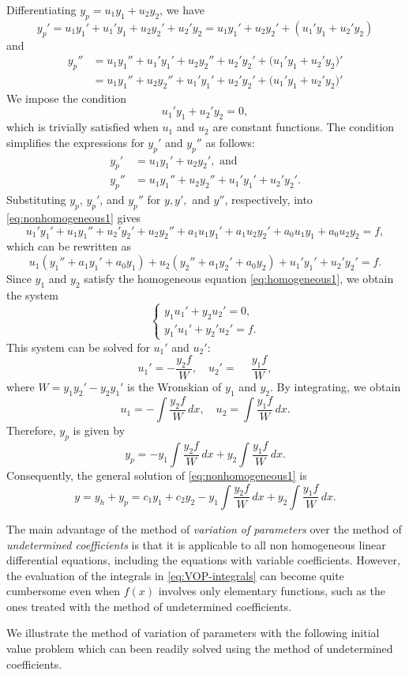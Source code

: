 Differentiating $y_p = u_1y_1 +u_2y_2$, we have
\[
y_p' = u_1 y_1' +u_1' y_1  + u_2 y_2'+  u_2' y_2
=  u_1 y_1' + u_2 y_2'+(u_1' y_1 + u_2' y_2)
\]
and 
\[
\begin{aligned}
y_p'' &=  u_1 y_1'' +u_1' y_1' +u_2 y_2''+  u_2' y_2' + \big( u_1' y_1 + u_2' y_2 \big)'\\[4pt]
&= u_1 y_1''+u_2 y_2'' +u_1' y_1' +  u_2' y_2' + \big( u_1' y_1 + u_2' y_2 \big)'
\end{aligned}
\]
We impose the condition
\[
u_1' y_1 + u_2' y_2 = 0, 
\]
which is trivially satisfied when $u_1$ and $u_2$ are constant functions.  
The condition simplifies the expressions for $y_p'$ and $y_p''$ as follows:
\[\begin{aligned}
y_p' &=  u_1 y_1' + u_2 y_2', \text{ and }\\
y_p'' &= u_1 y_1''+u_2 y_2'' +u_1' y_1' +  u_2' y_2'.
\end{aligned}
\]
Substituting $y_p$, $y_p'$, and $y_p''$ for $y, y',$ and $y''$, respectively, into \eqref{eq:nonhomogeneous1} gives
\[
	u_1' y_1' + u_1 y_1'' + u_2' y_2' + u_2 y_2''+a_1u_1 y_1' + a_1u_2 y_2'
+a_0u_1 y_1 + a_0u_2 y_2 = f,
\]
which can be rewritten as
\[
u_1 (y_1''+a_1 y_1'+a_0 y_1)+ u_2 (y_2''+a_1 y_2'+a_0 y_2) +u_1' y_1' +  u_2' y_2' 
= f.
\]
Since $y_1$ and $y_2$ satisfy the homogeneous equation \eqref{eq:homogeneous1}, we obtain the system
\[
\begin{cases}
	y_1 u_1' + y_2 u_2' = 0,\\
	y_1' u_1' + y_2' u_2' = f.
\end{cases}
\]
This system can be solved for $u_1'$ and $u_2'$:
\[
u_1' = -\frac{y_2 f}{W}, 
\quad 
u_2' = \phantom{-}\frac{y_1 f}{W},\]
where 
\(W = y_1 y_2' - y_2 y_1'\)
 is the Wronskian of  \(y_1\)  and  \(y_2.\)
By integrating, we obtain
\begin{equation}\label{eq:VOP-integrals}
u_1 = -\int \frac{y_2 f}{W} \, dx, 
\quad 
u_2 = \int \frac{y_1 f}{W} \, dx.
\end{equation}
Therefore,  $y_p$ is  given by
\begin{equation}\label{eq:particular-final-form}
y_p = -y_1 \int \frac{y_2 f}{W} \, dx 
+ y_2 \int \frac{y_1 f}{W} \, dx.
\end{equation}
Consequently,  the general solution of \eqref{eq:nonhomogeneous1} is
\[
y = y_h + y_p 
= c_1 y_1 + c_2 y_2 
- y_1 \int \frac{y_2 f}{W} \, dx 
+ y_2 \int \frac{y_1 f}{W} \, dx.
\]

\begin{remark}\label{re:variational-over-undertermined-coefficients}
	The main advantage of the method of \textit{variation of parameters} over the method of \textit{undetermined coefficients} is that 
	it is applicable to all non   homogeneous linear differential equations, including the equations with variable coefficients. However, the evaluation of the  integrals in \eqref{eq:VOP-integrals} can become quite cumbersome   even when  $f(x)$ involves only elementary functions, such as the ones treated  with the method of undetermined coefficients.
\end{remark}
 We illustrate the method of variation of parameters with the following initial value problem which can been readily solved using the method of undetermined coefficients.

